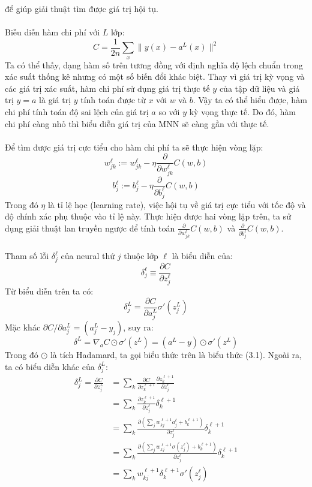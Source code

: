 để giúp giải thuật tìm được giá trị hội tụ.\\\\
Biễu diễn hàm chi phí với $L$ lớp:
\[
  C=\frac{1}{2n}\sum_x\|y(x)-a^L(x)\|^2
\]
Ta có thể thấy, dạng hàm số trên tương đồng với định nghĩa độ lệch chuẩn trong 
xác suất thống kê nhưng có một số biến đổi khác biệt. Thay vì giá trị kỳ vọng 
và các giá trị xác suất, hàm chi phí sử dụng giá trị thực tế $y$ của tập dữ 
liệu và giá trị $y=a$ là giá trị $y$ tính toán được từ $x$ với $w$ và $b$. Vậy 
ta có thể hiểu được, hàm chi phí tính toán độ sai lệch của giá trị $a$ so với 
$y$ kỳ vọng thực tế. Do đó, hàm chi phí càng nhỏ thì biểu diễn giá trị của 
MNN sẽ càng gần với thực tế.\\\\
Để tìm được giá trị cực tiểu cho hàm chi phí ta sẽ thực hiện vòng lặp:
\[
  w_{jk}^\ell:=w_{jk}^\ell-\eta\frac{\partial}{\partial w_{jk}^\ell}C(w,b)
\]
\[
  b_j^\ell:=b_j^\ell-\eta\frac{\partial}{\partial b_j^\ell}C(w,b)
\]
Trong đó $\eta$ là tỉ lệ học (learning rate), việc hội tụ về giá trị cực tiểu 
với tốc độ và độ chính xác phụ thuộc vào tỉ lệ này. Thực hiện được hai vòng lặp 
trên, ta sử dụng giải thuật lan truyền ngược để tính toán 
$\frac{\partial}{\partial w_{jk}^\ell}C(w,b)$ và 
$\frac{\partial}{\partial b_j^\ell}C(w,b)$.\\\\
Tham số lỗi $\delta_j^\ell$ của neural thứ $j$ thuộc lớp $\ell$ là biểu diễn 
của:
\[
  \delta_j^\ell \equiv \frac{\partial C}{\partial z_j^\ell}
\]
Từ biểu diễn trên ta có:
\[
  \delta_j^L = \frac{\partial C}{\partial a_j^L} \sigma'(z_j^L)
\]
Mặc khác $\partial C/\partial a_j^L = (a_j^L-y_j)$, suy ra:
\[
  \delta^L=\nabla_aC\odot\sigma'(z^L)=(a^L-y)\odot\sigma'(z^L)
\]
Trong đó $\odot$ là tích Hadamard, ta gọi biểu thức trên là biểu thức (3.1).
Ngoài ra, ta có biểu diễn khác của $\delta_j^L$:
\begin{align*}
  \delta_j^L=\frac{\partial C}{\partial z_j^L}
  &=\sum_k\frac{\partial C}{\partial z_k^{\ell+1}}\frac{\partial z_k^{\ell+1}}{\partial z_j^\ell}\\
  &=\sum_k\frac{\partial z_k^{\ell+1}}{\partial z_j^\ell}\delta_k^{\ell+1}\\
  &=\sum_k\frac{\partial(\sum_j w_{kj}^{\ell+1}a_j^\ell+b_k^{\ell+1})}{\partial z_j^\ell}\delta_k^{\ell+1}\\
  &=\sum_k\frac{\partial(\sum_j w_{kj}^{\ell+1}\sigma(z_j^\ell)+b_k^{\ell+1})}{\partial z_j^\ell}\delta_k^{\ell+1}\\
  &=\sum_k w_{kj}^{\ell+1}\delta_k^{\ell+1}\sigma'(z_j^\ell)
\end{align*}
